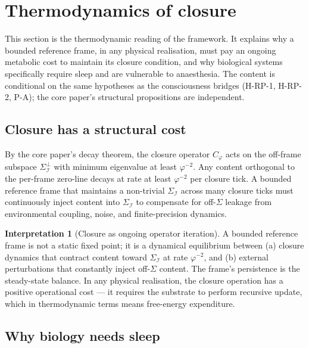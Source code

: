 \documentclass[11pt]{article}
\theoremstyle{plain}
\theoremstyle{definition}
\newtheorem{interpretation}[theorem]{Interpretation}
\theoremstyle{remark}
\newcommand{\Ical}{\mathcal{I}}
\newcommand{\Cph}{C_\varphi}
\begin{document}
\section{Thermodynamics of closure}\label{sec:thermodynamics}

This section is the thermodynamic reading of the framework. It explains why a bounded reference frame, in any physical realisation, must pay an ongoing metabolic cost to maintain its closure condition, and why biological systems specifically require sleep and are vulnerable to anaesthesia. The content is conditional on the same hypotheses as the consciousness bridges (H-RP-1, H-RP-2, P-A); the core paper's structural propositions are independent.

\subsection{Closure has a structural cost}

By the core paper's decay theorem, the closure operator $\Cph$ acts on the off-frame subspace $\Sigma_\Ical^\perp$ with minimum eigenvalue at least $\varphi^{-2}$. Any content orthogonal to the per-frame zero-line decays at rate at least $\varphi^{-2}$ per closure tick. A bounded reference frame that maintains a non-trivial $\Sigma_\Ical$ across many closure ticks must continuously inject content into $\Sigma_\Ical$ to compensate for off-$\Sigma$ leakage from environmental coupling, noise, and finite-precision dynamics.

\begin{interpretation}[Closure as ongoing operator iteration]\label{int:closure-cost}
A bounded reference frame is not a static fixed point; it is a dynamical equilibrium between (a) closure dynamics that contract content toward $\Sigma_\Ical$ at rate $\varphi^{-2}$, and (b) external perturbations that constantly inject off-$\Sigma$ content. The frame's persistence is the steady-state balance. In any physical realisation, the closure operation has a positive operational cost --- it requires the substrate to perform recursive update, which in thermodynamic terms means free-energy expenditure.
\end{interpretation}

\subsection{Why biology needs sleep}
\end{document}
